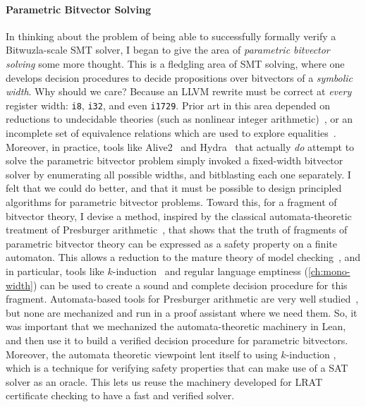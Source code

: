 \paragraph{Parametric Bitvector Solving}
In thinking about the problem of being able to successfully formally verify a Bitwuzla-scale SMT solver,
I began to give the area of \emph{parametric bitvector solving} some more thought.
This is a fledgling area of SMT solving, where one develops decision procedures to decide propositions over bitvectors of a \emph{symbolic width}.
Why should we care? Because an LLVM rewrite must be correct at \emph{every} register width: \texttt{i8}, \texttt{i32}, and even \texttt{i1729}.
Prior art in this area depended on reductions to undecidable theories (such as nonlinear integer arithmetic)~\citep{bit-precise-parametric-bv},
or an incomplete set of equivalence relations which are used to explore equalities~\citep{pichora2003automated,bjorner1998deciding}.
Moreover, in practice, tools like Alive2~\citep{lopes2021alive2} and Hydra~\citep{hydra} that actually \emph{do} attempt to solve the parametric bitvector problem simply invoked a fixed-width bitvector solver by enumerating all possible widths, and bitblasting each one separately.
I felt that we could do better, and that it must be possible to design principled algorithms for parametric bitvector problems.
Toward this, for a fragment of bitvector theory, I devise a method, inspired by the classical automata-theoretic treatment of Presburger arithmetic~\citep{Büchi1960,automata-strike-back},
that shows that the truth of fragments of parametric bitvector theory can be expressed as a safety property on a finite automaton.
This allows a reduction to the mature theory of model checking~\citep{biere1999symbolic,bradley2011sat}, and in particular, tools like $k$-induction~\citep{sheeran2000checking} and regular language emptiness
(\cref{ch:mono-width}) can be used to create a sound and complete decision procedure for this fragment.
Automata-based tools for Presburger arithmetic are very well studied~\citep{henriksen1995mona,boigelot2004counting,chocholaty2024mata},
but none are mechanized and run in a proof assistant where we need them.
So, it was important that we mechanized the automata-theoretic machinery in Lean,
and then use it to build a verified decision procedure for parametric bitvectors.
Moreover, the automata theoretic viewpoint lent itself to using $k$-induction \cite{sheeran2000checking},
which is a technique for verifying safety properties that can make use of a SAT solver as an oracle.
This lets us reuse the machinery developed for LRAT certificate checking to have a fast and verified solver.


